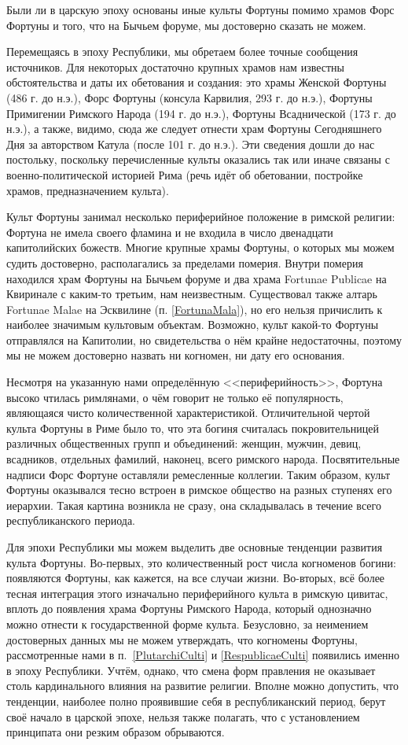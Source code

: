 Были ли в царскую эпоху основаны иные культы Фортуны помимо храмов Форс Фортуны и того, что на Бычьем форуме, мы достоверно сказать не можем.

Перемещаясь в эпоху Республики, мы обретаем более точные сообщения источников. Для некоторых достаточно крупных храмов нам известны обстоятельства и даты их обетования и создания: это храмы Женской Фортуны (486 г. до н.э.), Форс Фортуны (консула Карвилия, 293 г. до н.э.), Фортуны Примигении Римского Народа (194 г. до н.э.), Фортуны Всаднической (173 г. до н.э.), а также, видимо, сюда же следует отнести храм Фортуны Сегодняшнего Дня за авторством Катула (после 101 г. до н.э.). Эти сведения дошли до нас постольку, поскольку перечисленные культы оказались так или иначе связаны с военно-политической историей Рима (речь идёт об обетовании, постройке храмов, предназначением культа).

Культ Фортуны занимал несколько периферийное положение в римской религии: Фортуна не имела своего фламина и не входила в число двенадцати капитолийских божеств. Многие крупные храмы Фортуны, о которых мы можем судить достоверно, располагались за пределами померия. Внутри померия находился храм Фортуны на Бычьем форуме и два храма Fortunae Publicae на Квиринале с каким-то третьим, нам неизвестным. Существовал также алтарь Fortunae Malae на Эсквилине (п. \ref{FortunaMala}), но его нельзя причислить к наиболее значимым культовым объектам. Возможно, культ какой-то Фортуны отправлялся на Капитолии, но свидетельства о нём крайне недостаточны, поэтому мы не можем достоверно назвать ни когномен, ни дату его основания.

Несмотря на указанную нами определённую <<периферийность>>, Фортуна высоко чтилась римлянами, о чём говорит не только её популярность, являющаяся чисто количественной характеристикой. Отличительной чертой культа Фортуны в Риме было то, что эта богиня считалась покровительницей различных общественных групп и объединений: женщин, мужчин, девиц, всадников, отдельных фамилий, наконец, всего римского народа. Посвятительные надписи Форс Фортуне оставляли ремесленные коллегии. Таким образом, культ Фортуны оказывался тесно встроен в римское общество на разных ступенях его иерархии. Такая картина возникла не сразу, она складывалась в течение всего республиканского периода.

Для эпохи Республики мы можем выделить две основные тенденции развития культа Фортуны. Во-первых, это количественный рост числа когноменов богини: появляются Фортуны, как кажется, на все случаи жизни. Во-вторых, всё более тесная интеграция этого изначально периферийного культа в римскую цивитас, вплоть до появления храма Фортуны Римского Народа, который однозначно можно отнести к государственной форме культа. Безусловно, за неимением достоверных данных мы не можем утверждать, что когномены Фортуны, рассмотренные нами в п.~\ref{PlutarchiCulti} и \ref{RespublicaeCulti} появились именно в эпоху Республики. Учтём, однако, что смена форм правления не оказывает столь кардинального влияния на развитие религии. Вполне можно допустить, что тенденции, наиболее полно проявившие себя в республиканский период, берут своё начало в царской эпохе, нельзя также полагать, что с установлением принципата они резким образом обрываются.

